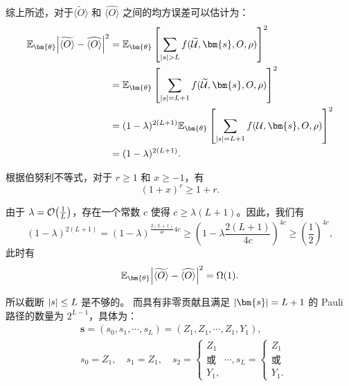 综上所述，对于$\widetilde{\langle O \rangle}$ 和 $\widehat{\langle O \rangle}$ 之间的均方误差可以估计为： 
\begin{equation} 
    \begin{aligned} 
        \mathbb{E}_{\bm{\theta}}\abs{\widetilde{\langle O \rangle}-\widehat{\langle O \rangle}}^2 &=\mathbb{E}_{\bm{\theta}}\left[\sum_{\abs{s}> L}f(\widetilde{\mathcal{U}},\bm{s},O,\rho)\right]^2\\
         &=\mathbb{E}_{\bm{\theta}}\left[\sum_{\abs{s}=L+1}f(\widetilde{\mathcal{U}},\bm{s},O,\rho)\right]^2\\
        &= (1-\lambda)^{2(L+1)}\mathbb{E}_{\bm{\theta}} \left[\sum_{\abs{s}=L+1}{f}(\mathcal{U},\bm{s},O,\rho)\right]^2\\ 
        &=(1-\lambda)^{2(L+1)}.
    \end{aligned} 
\end{equation}

根据伯努利不等式，对于 $r\geq 1$ 和 $x\geq -1$，有 
\begin{equation} 
    (1+x)^r\geq 1+r. 
\end{equation}

由于 $\lambda=\order{\frac{1}{L}}$，存在一个常数 $c$ 使得 $c\geq \lambda (L+1)$。因此，我们有 \begin{equation} 
    (1-\lambda)^{2(L+1)}= (1-\lambda)^{\frac{2(L+1)}{4c} 4c} \geq \left(1-\lambda \frac{2(L+1)}{4c} \right)^{4c}\geq \left(\frac{1}{2}\right)^{4c}, 
\end{equation} 
此时有
\begin{equation} 
    \mathbb{E}_{\bm{\theta}}\abs{\widetilde{\langle O \rangle}-\widehat{\langle O \rangle}}^2 =\Omega(1). 
\end{equation}

所以截断 $\abs{s}\leq L$ 是不够的。 而具有非零贡献且满足 $\abs{\bm{s}}=L+1$ 的 Pauli 路径的数量为 $2^{L-1}$，具体为：
\begin{equation} 
    \begin{aligned}
        &\bm{s}=(s_0,s_1,\cdots,s_L)=(Z_1,Z_1,\cdots,Z_1,Y_1),\\
        &s_0=Z_1, \quad s_1=Z_1, \quad s_2=\begin{cases}
            Z_1 \\ \text{或}\\
            Y_1,
        \end{cases}
        \cdots, s_L=\begin{cases}
            Z_1 \\ \text{或} \\
            Y_1.
        \end{cases}
    \end{aligned}
\end{equation}

